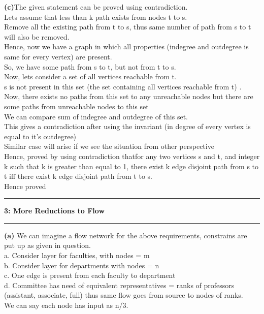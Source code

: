 \documentclass[11pt]{article}
\newcommand\question[2]{\vspace{.25in}\hrule\textbf{#1: #2}\vspace{.5em}\hrule\vspace{.10in}}
\renewcommand\part[1]{\vspace{.10in}\textbf{(#1)}}
\begin{document}
\part{c}The given statement can be proved using contradiction.\\
Lets assume that less than k path exists from nodes t to s.\\
Remove all the existing path from t to s, thus same number of path from s to t will also be removed.\\
Hence, now we have a graph in which all properties (indegree and outdegree is same for every vertex) are present.\\
So, we have some path from s to t, but not from t to s.\\
Now, lets consider a set of all vertices reachable from t.\\
s is not present in this set (the set containing all vertices reachable from t) .\\
Now, there exists no paths from this set to any unreachable nodes but there are some paths from unreachable nodes to this set\\
We can compare sum of indegree and outdegree of this set.\\
This gives a contradiction after using the invariant (in degree of every vertex is equal to it's outdegree)\\
Similar case will arise if we see the situation from other perspective\\
Hence, proved by using contradiction thatfor any two vertices s and t, and integer k such that k is greater than equal to 1, there exist k edge disjoint path from s to t iff there exist k edge disjoint path from t to s.\\
Hence proved\\

\question{3}{More Reductions to Flow}
 
\part{a}
We can imagine a flow network for the above requirements, constrains are put up as given in question.\\
a. Consider layer for faculties, with nodes = m\\
b. Consider layer for departments with nodes = n\\
c. One edge is present from each faculty to department\\
d. Committee has need of equivalent representatives = ranks of professors (assistant, associate, full) thus same flow goes from source to nodes of ranks.\\
We can say each node has input as n/3.\\[15pt]
\end{document}
